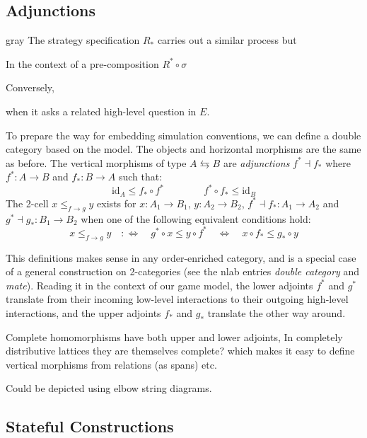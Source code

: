 \documentclass[acmsmall,review,anonymous]{acmart}\settopmatter{printfolios=true,printccs=false,printacmref=false}
\begin{document}
\subsection{Adjunctions}
\begin{color}{gray}
The strategy specification $R_*$
carries out a similar process but





In the context of a pre-composition $R^* \circ \sigma$

Conversely,


when it asks a related high-level question in $E$.



To prepare the way for embedding simulation conventions,
we can define a double category based on the model.
The objects and horizontal morphisms
are the same as before.
The vertical morphisms of type $A \leftrightarrows B$
are \emph{adjunctions} $f^* \dashv f_*$
where $f^* : A \rightarrow B$ and $f_* : B \rightarrow A$
such that:
\[
  \mathrm{id}_A \le f_* \circ f^*
  \qquad \qquad
  f^* \circ f_* \le \mathrm{id}_B
\]
The 2-cell $x \le_{f \rightarrow g} y$
exists for
$x : A_1 \rightarrow B_1$,
$y : A_2 \rightarrow B_2$,
$f^* \dashv f_* : A_1 \rightarrow A_2$ and
$g^* \dashv g_* : B_1 \rightarrow B_2$
when one of the following equivalent conditions hold:
\begin{equation} \label{eqn:gc}
  x \le_{f \rightarrow g} y
  \quad :\Leftrightarrow \quad
  g^* \circ x \le y \circ f^*
  \quad \Leftrightarrow \quad
  x \circ f_* \le g_* \circ y
\end{equation}

This definitions makes sense in any order-enriched category,
and is a special case of a general construction on 2-categories
(see the nlab entries \emph{double category} and \emph{mate}).
Reading it in the context of our game model,
the lower adjoints $f^*$ and $g^*$
translate from their incoming low-level interactions
to their outgoing high-level interactions,
and the upper adjoints $f_*$ and $g_*$
translate the other way around.

Complete homomorphisms have both upper and lower adjoints,
In completely distributive lattices
they are themselves complete?
which makes it easy to define vertical morphisms
from relations (as spans) etc.

Could be depicted using elbow string diagrams.
\end{color}


\subsection{Stateful Constructions} %
\end{document}
